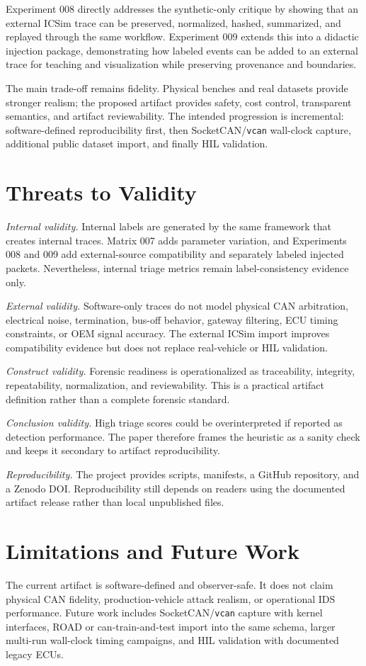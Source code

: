 \documentclass[conference]{IEEEtran}
\begin{document}
Experiment 008 directly addresses the synthetic-only critique by showing that an external ICSim trace can be preserved, normalized, hashed, summarized, and replayed through the same workflow. Experiment 009 extends this into a didactic injection package, demonstrating how labeled events can be added to an external trace for teaching and visualization while preserving provenance and boundaries.

The main trade-off remains fidelity. Physical benches and real datasets provide stronger realism; the proposed artifact provides safety, cost control, transparent semantics, and artifact reviewability. The intended progression is incremental: software-defined reproducibility first, then SocketCAN/\texttt{vcan} wall-clock capture, additional public dataset import, and finally HIL validation.

\section{Threats to Validity}
\textit{Internal validity.} Internal labels are generated by the same framework that creates internal traces. Matrix 007 adds parameter variation, and Experiments 008 and 009 add external-source compatibility and separately labeled injected packets. Nevertheless, internal triage metrics remain label-consistency evidence only.

\textit{External validity.} Software-only traces do not model physical CAN arbitration, electrical noise, termination, bus-off behavior, gateway filtering, ECU timing constraints, or OEM signal accuracy. The external ICSim import improves compatibility evidence but does not replace real-vehicle or HIL validation.

\textit{Construct validity.} Forensic readiness is operationalized as traceability, integrity, repeatability, normalization, and reviewability. This is a practical artifact definition rather than a complete forensic standard.

\textit{Conclusion validity.} High triage scores could be overinterpreted if reported as detection performance. The paper therefore frames the heuristic as a sanity check and keeps it secondary to artifact reproducibility.

\textit{Reproducibility.} The project provides scripts, manifests, a GitHub repository, and a Zenodo DOI. Reproducibility still depends on readers using the documented artifact release rather than local unpublished files.

\section{Limitations and Future Work}
The current artifact is software-defined and observer-safe. It does not claim physical CAN fidelity, production-vehicle attack realism, or operational IDS performance. Future work includes SocketCAN/\texttt{vcan} capture with kernel interfaces, ROAD or can-train-and-test import into the same schema, larger multi-run wall-clock timing campaigns, and HIL validation with documented legacy ECUs.
\end{document}
